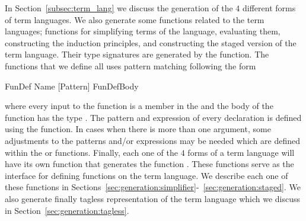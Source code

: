 In Section~\ref{subsec:term_lang} we discuss the generation of the $4$ different forms of term languages. We also generate some functions related to the term languages;  functions for simplifying terms of the language, evaluating them, constructing the induction principles, and constructing the staged version of the term language. Their type signatures are generated by the  function. The functions that we define all uses pattern matching following the form
\begin{hscode}
FunDef Name [Pattern] FunDefBody
\end{hscode}
where every input to the function is a member in the \lstmath{[Pattern]} and the body of the function has the type . The pattern and expression of every declaration is defined using the  function. In cases when there is more than one argument, some adjustments to the patterns and/or expressions may be needed which are defined within the  or  functions. Finally, each one of the $4$ forms of a term language will have its own  function that generates the function . These functions serve as the interface for defining functions on the term language. We describe each one of these functions in Sections~\ref{sec:generation:simplifier}-~\ref{sec:generation:staged}. 
We also generate finally tagless representation of the term language which we discuss in Section~\ref{sec:generation:tagless}.  

